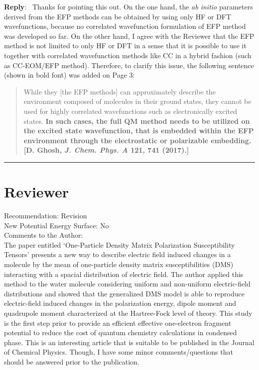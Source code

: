 \documentclass[12pt]{article}
\newcounter{reviewer}
\newcounter{point}[reviewer]
\newcommand{\reviewersection}{\stepcounter{reviewer} \bigskip \hrule
 \section*{Reviewer \thereviewer}}
\newenvironment{reply}
 {\medskip \noindent \begin{sf} \color{blue} \textbf{Reply}:\ }
 {\medskip \end{sf}}
\begin{document}
\begin{reply}
Thanks for pointing this out. 
On the one hand, the \emph{ab initio} parameters derived from the EFP methods
can be obtained by using only HF or DFT wavefunctions, 
because no correlated wavefunction formulation of EFP method
was developed so far. %
On the other hand, I agree with the Reviewer that the EFP method is not limited to only HF or DFT
in a sense that it is possible to use it together with correlated wavefunction methods like CC
in a hybrid fashion (such as CC-EOM/EFP method). 
Therefore, to clarify this issue, the following sentence (shown in bold font) was added on Page 3: 
\begin{quote}
While they [the EFP methods] can approximately describe the environment composed of molecules in their ground states,
they cannot be used for highly correlated wavefunctions such as electronically excited states. 
\textbf{\noindent
In such cases, the full QM method needs to be utilized on the excited state wavefunction, that is 
embedded within the EFP environment through the electrostatic 
or polarizable embedding. [D. Ghosh, \emph{J. Chem. Phys. A} {\bf 121}, 741 (2017).] }
\end{quote}
\end{reply}

\clearpage
\reviewersection
Recommendation: Revision \\
New Potential Energy Surface: No \\
Comments to the Author: \\

The paper entitled `One-Particle Density Matrix Polarization Susceptibility Tensors' 
presents a new way to describe electric field induced changes in a molecule by the mean of 
one-particle density matrix susceptibilities (DMS) interacting with a spacial distribution 
of electric field. The author applied this method to the water molecule considering uniform 
and non-uniform electric-field distributions and showed that the generalized DMS model 
is able to reproduce electric-field induced changes in the polarization energy, dipole moment 
and quadrupole moment characterized at the Hartree-Fock level of theory. This study 
is the first step prior to provide an efficient effective one-electron fragment potential 
to reduce the cost of quantum chemistry calculations in condensed phase. This is 
an interesting article that is suitable to be published in the Journal of Chemical Physics. 
Though, I have some minor comments/questions that should be answered prior to the publication. 
\end{document}
